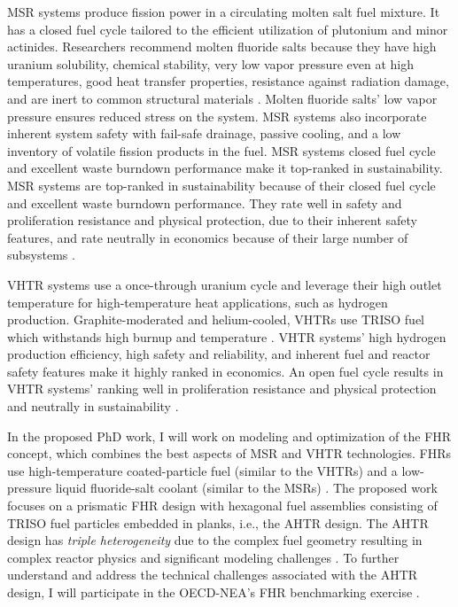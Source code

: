 \gls{MSR} systems produce fission power in a circulating molten salt fuel mixture. 
It has a closed fuel cycle tailored to the efficient utilization of plutonium 
and minor actinides. 
Researchers recommend molten fluoride salts because they have high uranium solubility, 
chemical stability, very low vapor pressure even at high temperatures, good heat 
transfer properties, resistance against radiation damage, and are inert to common
structural materials \cite{rosenthal_molten-salt_1970}.  
Molten fluoride salts' low vapor pressure ensures reduced stress on the system. 
MSR systems also incorporate inherent system safety with fail-safe drainage, 
passive cooling, and a low inventory of volatile fission products in the fuel. 
\gls{MSR} systems closed fuel cycle and excellent waste burndown performance 
make it top-ranked in sustainability. 
MSR systems are top-ranked in sustainability because of their closed fuel cycle 
and excellent waste burndown performance. 
They rate well in safety and proliferation resistance and physical protection, 
due to their inherent safety features, and rate neutrally in economics because of
their large number of subsystems \cite{gif_technology_2002}.  

\gls{VHTR} systems use a once-through uranium cycle and leverage their 
high outlet temperature for high-temperature heat applications, such as hydrogen 
production. 
Graphite-moderated and helium-cooled, \glspl{VHTR} use \gls{TRISO} fuel
which withstands high burnup and temperature \cite{gif_technology_2002}.  
\gls{VHTR} systems' high hydrogen production efficiency, high safety and 
reliability, and inherent fuel and reactor safety features make it highly 
ranked in economics. 
An open fuel cycle results in \gls{VHTR} systems' ranking well in proliferation 
resistance and physical protection and neutrally in sustainability 
\cite{gif_technology_2002}. 

In the proposed PhD work, I will work on modeling and optimization of the 
\gls{FHR} concept, which combines the best aspects of \gls{MSR} and \gls{VHTR} 
technologies. 
\glspl{FHR} use high-temperature coated-particle fuel (similar to the \glspl{VHTR}) 
and a low-pressure liquid fluoride-salt coolant (similar to the \glspl{MSR})
\cite{forsberg_fluoride-salt-cooled_2012,facilitators_fluoride-salt-cooled_2013}.
The proposed work focuses on a prismatic \gls{FHR} design with hexagonal fuel 
assemblies consisting of \gls{TRISO} fuel particles embedded in planks, i.e., 
the \gls{AHTR} design.
The \gls{AHTR} design has \emph{triple heterogeneity} due to the complex fuel 
geometry resulting in complex reactor physics and significant modeling challenges 
\cite{petrovic_benchmark_2021}. 
To further understand and address the technical challenges associated with the 
\gls{AHTR} design, I will participate in the \gls{OECD}-\gls{NEA}'s \gls{FHR} 
benchmarking exercise \cite{petrovic_benchmark_2021}.

